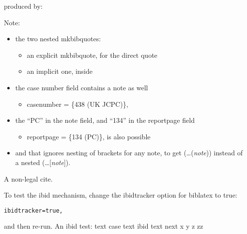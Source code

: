 \bigskip
produced by:

\bigskip
{\ttfamily
{}\hspace{0.1pt}\hspace{0.1pt}\hspace{0.1pt}\hspace{0.1pt}
}

\bigskip
{}

\bigskip
Note:
\begin{itemize}
\item the two nested mkbibquotes:
		\begin{itemize}
		\item an explicit mkbibquote, for the direct quote
		\item an implicit one, inside 
		\end{itemize}
\item the case number field contains a note as well 
		\begin{itemize}
		\item {\ttfamily casenumber = \{438 (UK JCPC)\},}
		\end{itemize}
\item the ``PC'' in the note field, and ``134'' in the reportpage field	
		\begin{itemize}
		\item {\ttfamily reportpage = \{134 (PC)\},} is also possible
		\end{itemize}
		\item and that  ignores nesting of brackets for any note, to get (\ldots (\textit{note})) instead of a nested (\ldots [\textit{note}]).
\end{itemize}

A non-legal cite\autocite{westfahl:space}. 

To test the ibid mechanism, change the ibidtracker option for biblatex to true:
\begin{verbatim}ibidtracker=true,\end{verbatim} and then re-run.
An ibid test: text case text ibid text next
x
y
z
zz



